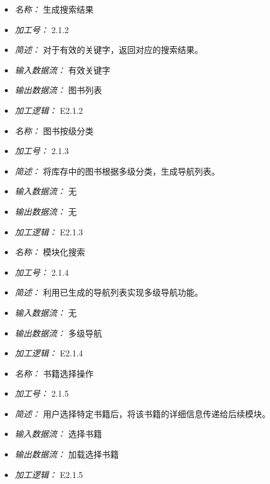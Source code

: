 \begin{itemize}
\item \textit{名称： }生成搜索结果
\item \textit{加工号： }2.1.2 
\item \textit{简述： }对于有效的关键字，返回对应的搜索结果。 
\item \textit{输入数据流： }有效关键字
\item \textit{输出数据流： }图书列表
\item \textit{加工逻辑： }E2.1.2

\end{itemize}


\vspace{-1mm}


\begin{itemize}
\item \textit{名称： } 图书按级分类
\item \textit{加工号： }2.1.3 
\item \textit{简述： }将库存中的图书根据多级分类，生成导航列表。 
\item \textit{输入数据流： }无
\item \textit{输出数据流： }无
\item \textit{加工逻辑： }E2.1.3

\end{itemize}


\vspace{-1mm}


\begin{itemize}
\item \textit{名称： }模块化搜索
\item \textit{加工号： }2.1.4 
\item \textit{简述： }利用已生成的导航列表实现多级导航功能。 
\item \textit{输入数据流： }无
\item \textit{输出数据流： }多级导航 
\item \textit{加工逻辑： }E2.1.4

\end{itemize}


\vspace{-1mm}


\begin{itemize}
\item \textit{名称： }书籍选择操作
\item \textit{加工号： }2.1.5 
\item \textit{简述： }用户选择特定书籍后，将该书籍的详细信息传递给后续模块。 
\item \textit{输入数据流： }选择书籍
\item \textit{输出数据流： }加载选择书籍
\item \textit{加工逻辑： }E2.1.5

\end{itemize}


